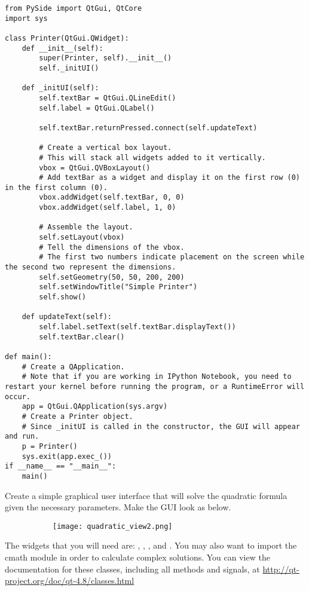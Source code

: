 \begin{lstlisting}
from PySide import QtGui, QtCore
import sys

class Printer(QtGui.QWidget):
	def __init__(self):
		super(Printer, self).__init__()
		self._initUI()

	def _initUI(self):
		self.textBar = QtGui.QLineEdit()
		self.label = QtGui.QLabel()
		
		self.textBar.returnPressed.connect(self.updateText)
	
		# Create a vertical box layout.
		# This will stack all widgets added to it vertically.
		vbox = QtGui.QVBoxLayout()
		# Add textBar as a widget and display it on the first row (0) in the first column (0).
        vbox.addWidget(self.textBar, 0, 0)
		vbox.addWidget(self.label, 1, 0)
		
		# Assemble the layout.
		self.setLayout(vbox)
		# Tell the dimensions of the vbox.
		# The first two numbers indicate placement on the screen while the second two represent the dimensions.
		self.setGeometry(50, 50, 200, 200)
		self.setWindowTitle("Simple Printer")
		self.show()
	
	def updateText(self):
		self.label.setText(self.textBar.displayText())
		self.textBar.clear()
		
def main():
	# Create a QApplication.
    # Note that if you are working in IPython Notebook, you need to restart your kernel before running the program, or a RuntimeError will occur.
	app = QtGui.QApplication(sys.argv)
	# Create a Printer object.
    # Since _initUI is called in the constructor, the GUI will appear and run.
	p = Printer()
	sys.exit(app.exec_())
if __name__ == "__main__":
	main()

\end{lstlisting}

\begin{problem}
Create a simple graphical user interface that will solve the quadratic formula given the necessary parameters.
Make the GUI look as below.
\begin{figure}[H]
\centering
\begin{comment}
\begin{subfigure}[b]{.49\textwidth}
\texttt{[image: quadratic\_view.png]}
\end{subfigure}
\end{comment}
\begin{subfigure}[b]{.49\textwidth}
\texttt{[image: quadratic\_view2.png]}
\end{subfigure}
\end{figure}
The widgets that you will need are: , , , and . You may also want to import the cmath module in order to calculate complex solutions.
You can view the documentation for these classes, including all methods and signals, at \url{http://qt-project.org/doc/qt-4.8/classes.html}
\label{prob:quadCalc}
\end{problem}


